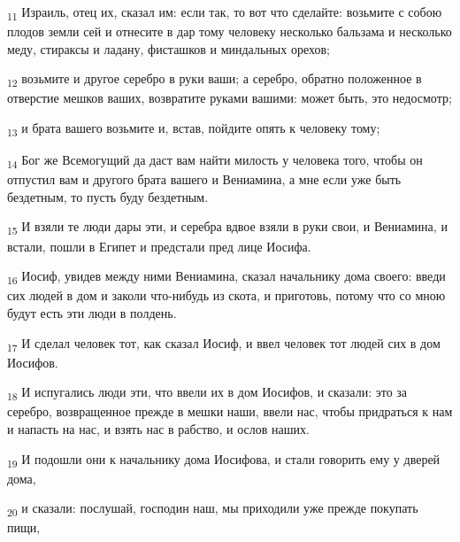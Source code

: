 \begin{tcolorbox}
\textsubscript{11} Израиль, отец их, сказал им: если так, то вот что сделайте: возьмите с собою плодов земли сей и отнесите в дар тому человеку несколько бальзама и несколько меду, стираксы и ладану, фисташков и миндальных орехов;
\end{tcolorbox}
\begin{tcolorbox}
\textsubscript{12} возьмите и другое серебро в руки ваши; а серебро, обратно положенное в отверстие мешков ваших, возвратите руками вашими: может быть, это недосмотр;
\end{tcolorbox}
\begin{tcolorbox}
\textsubscript{13} и брата вашего возьмите и, встав, пойдите опять к человеку тому;
\end{tcolorbox}
\begin{tcolorbox}
\textsubscript{14} Бог же Всемогущий да даст вам найти милость у человека того, чтобы он отпустил вам и другого брата вашего и Вениамина, а мне если уже быть бездетным, то пусть буду бездетным.
\end{tcolorbox}
\begin{tcolorbox}
\textsubscript{15} И взяли те люди дары эти, и серебра вдвое взяли в руки свои, и Вениамина, и встали, пошли в Египет и предстали пред лице Иосифа.
\end{tcolorbox}
\begin{tcolorbox}
\textsubscript{16} Иосиф, увидев между ними Вениамина, сказал начальнику дома своего: введи сих людей в дом и заколи что-нибудь из скота, и приготовь, потому что со мною будут есть эти люди в полдень.
\end{tcolorbox}
\begin{tcolorbox}
\textsubscript{17} И сделал человек тот, как сказал Иосиф, и ввел человек тот людей сих в дом Иосифов.
\end{tcolorbox}
\begin{tcolorbox}
\textsubscript{18} И испугались люди эти, что ввели их в дом Иосифов, и сказали: это за серебро, возвращенное прежде в мешки наши, ввели нас, чтобы придраться к нам и напасть на нас, и взять нас в рабство, и ослов наших.
\end{tcolorbox}
\begin{tcolorbox}
\textsubscript{19} И подошли они к начальнику дома Иосифова, и стали говорить ему у дверей дома,
\end{tcolorbox}
\begin{tcolorbox}
\textsubscript{20} и сказали: послушай, господин наш, мы приходили уже прежде покупать пищи,
\end{tcolorbox}
